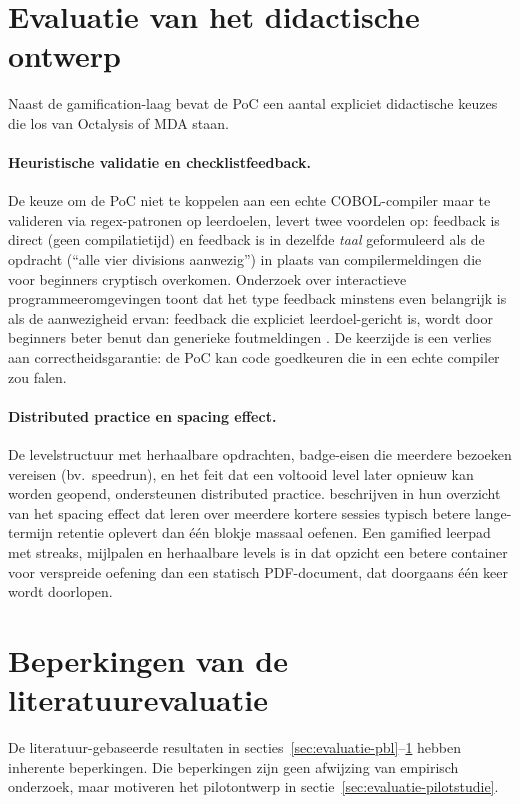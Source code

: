 \section{Evaluatie van het didactische ontwerp}
\label{sec:evaluatie-didactisch}

Naast de gamification-laag bevat de PoC een aantal expliciet didactische keuzes die los van Octalysis of MDA staan.

\paragraph{Heuristische validatie en checklistfeedback.}
De keuze om de PoC niet te koppelen aan een echte COBOL-compiler maar te valideren via regex-patronen op leerdoelen, levert twee voordelen op: feedback is direct (geen compilatietijd) en feedback is in dezelfde \emph{taal} geformuleerd als de opdracht (``alle vier divisions aanwezig'') in plaats van compilermeldingen die voor beginners cryptisch overkomen.
Onderzoek over interactieve programmeeromgevingen toont dat het type feedback minstens even belangrijk is als de aanwezigheid ervan: feedback die expliciet leerdoel-gericht is, wordt door beginners beter benut dan generieke foutmeldingen \autocite{Zhan2022}. 
De keerzijde is een verlies aan correctheidsgarantie: de PoC kan code goedkeuren die in een echte compiler zou falen.

\paragraph{Distributed practice en spacing effect.}
De levelstructuur met herhaalbare opdrachten, badge-eisen die meerdere bezoeken vereisen (bv.\ speedrun), en het feit dat een voltooid level later opnieuw kan worden geopend, ondersteunen distributed practice. 
\textcite{Cepeda2006} beschrijven in hun overzicht van het spacing effect dat leren over meerdere kortere sessies typisch betere lange-termijn retentie oplevert dan één blokje massaal oefenen. 
Een gamified leerpad met streaks, mijlpalen en herhaalbare levels is in dat opzicht een betere container voor verspreide oefening dan een statisch PDF-document, dat doorgaans één keer wordt doorlopen.

\section{Beperkingen van de literatuurevaluatie}
\label{sec:evaluatie-beperkingen}

De literatuur-gebaseerde resultaten in secties~\ref{sec:evaluatie-pbl}--\ref{sec:evaluatie-didactisch} hebben inherente beperkingen.
Die beperkingen zijn geen afwijzing van empirisch onderzoek, maar motiveren het pilotontwerp in sectie~\ref{sec:evaluatie-pilotstudie}.

